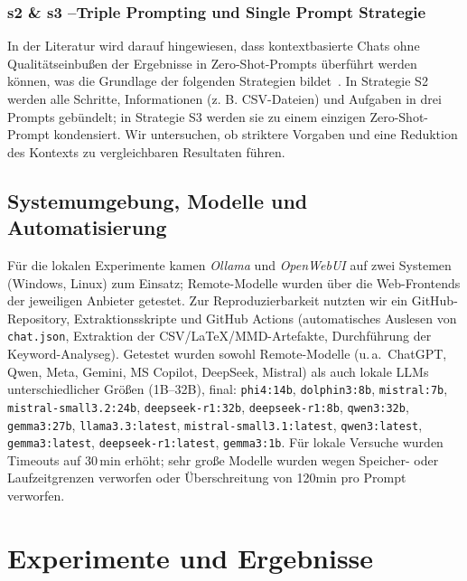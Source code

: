 \documentclass[runningheads]{llncs}
\begin{document}
\subsubsection{s2 \& s3 --Triple Prompting und Single Prompt Strategie}
In der Literatur wird darauf hingewiesen, dass kontextbasierte Chats ohne Qualitätseinbußen der Ergebnisse in Zero-Shot-Prompts überführt werden können, was die Grundlage der folgenden Strategien bildet~\cite{ref_article5}. In Strategie S2 werden alle Schritte, Informationen (z. B. CSV-Dateien) und Aufgaben in drei Prompts gebündelt; in Strategie S3 werden sie zu einem einzigen Zero-Shot-Prompt kondensiert. Wir untersuchen, ob striktere Vorgaben und eine Reduktion des Kontexts zu vergleichbaren Resultaten führen.

\subsection{Systemumgebung, Modelle und Automatisierung}
Für die lokalen Experimente kamen \emph{Ollama} und \emph{OpenWebUI} auf zwei Systemen (Windows, Linux) zum Einsatz; Remote-Modelle wurden über die Web-Frontends der jeweiligen Anbieter getestet. Zur Reproduzierbarkeit nutzten wir ein GitHub-Repository, Extraktionsskripte und GitHub Actions (automatisches Auslesen von \texttt{chat.json}, Extraktion der CSV/LaTeX/MMD-Artefakte, Durchführung der Keyword-Analyseg). Getestet wurden sowohl Remote-Modelle (u.\,a.\ ChatGPT, Qwen, Meta, Gemini, MS Copilot, DeepSeek, Mistral) als auch lokale LLMs unterschiedlicher Größen (1B–32B), final: \texttt{phi4:14b}, \texttt{dolphin3:8b}, \texttt{mistral:7b}, \texttt{mistral-small3.2:24b}, \texttt{deepseek-r1:32b}, \texttt{deepseek-r1:8b}, \texttt{qwen3:32b}, \texttt{gemma3:27b}, \texttt{llama3.3:latest}, \texttt{mistral-small3.1:latest}, \texttt{qwen3:latest}, \texttt{gemma3:latest}, \texttt{deepseek-r1:latest}, \texttt{gemma3:1b}. Für lokale Versuche wurden Timeouts auf 30\,min erhöht; sehr große Modelle wurden wegen Speicher- oder Laufzeitgrenzen verworfen oder Überschreitung von 120min pro Prompt verworfen.

\section{Experimente und Ergebnisse}
\end{document}
